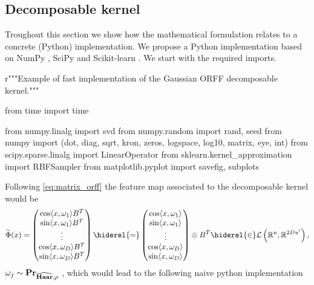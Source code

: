 \subsection{Decomposable kernel}
Troughout this section we show how the mathematical formulation relates to a concrete (Python) implementation. We propose a Python implementation based on NumPy \citep{oliphant2006guide}, SciPy \citep{jones2014scipy} and Scikit-learn \cite{pedregosa2011scikit}. We start with the required imports.
\begin{pyblock}
r"""Example of fast implementation of the Gaussian ORFF decomposable kernel."""

from time import time

from numpy.linalg import svd
from numpy.random import rand, seed
from numpy import (dot, diag, sqrt, kron, zeros,
                   logspace, log10, matrix, eye, int)
from scipy.sparse.linalg import LinearOperator
from sklearn.kernel_approximation import RBFSampler
from matplotlib.pyplot import savefig, subplots
\end{pyblock}
Following \cref{eq:matrix_orff} the feature map associated to the decomposable kernel would be
\begin{dmath*}
\tildePhi{\omega}(x) = \begin{pmatrix} \cos\inner{x,\omega_1}B^T \\
\sin\inner{x,\omega_1}B^T \\
\vdots \\
\cos\inner{x,\omega_D}B^T \\
\sin\inner{x,\omega_D}B^T
\end{pmatrix}
\hiderel{=}
\begin{pmatrix} \cos\inner{x,\omega_1} \\
\sin\inner{x,\omega_1} \\
\vdots \\
\cos\inner{x,\omega_D} \\
\sin\inner{x,\omega_D}
\end{pmatrix}\otimes B^T
\hiderel{\in}\mathcal{L}\left(\mathbb{R}^u, \mathbb{R}^{2Du'}\right),
\end{dmath*}
$\omega_j\sim{\mathbf{{Pr}}}_{\widehat{\mathbf{Haar}}, \rho}$ \iid, which would lead to the following naive python implementation

